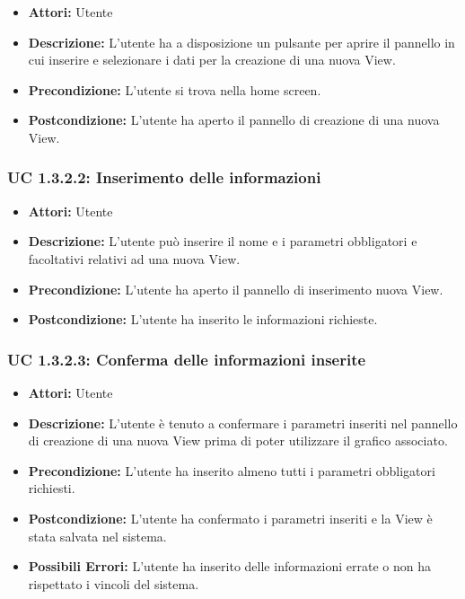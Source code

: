 \begin{itemize}
\item \textbf{Attori:} Utente
\item \textbf{Descrizione:} L'utente ha a disposizione un pulsante per aprire il pannello in cui inserire e selezionare i dati per la creazione di una nuova View.
\item \textbf{Precondizione:} L'utente si trova nella home screen.
\item \textbf{Postcondizione:} L'utente ha aperto il pannello di creazione di una nuova View.
\end{itemize}

\subsubsection{UC 1.3.2.2: Inserimento delle informazioni}

\begin{itemize}
\item \textbf{Attori:} Utente
\item \textbf{Descrizione:} L'utente può inserire il nome e i parametri obbligatori e facoltativi relativi ad una nuova View.
\item \textbf{Precondizione:} L'utente ha aperto il pannello di inserimento nuova View.
\item \textbf{Postcondizione:} L'utente ha inserito le informazioni richieste.
\end{itemize}

\subsubsection{UC 1.3.2.3: Conferma delle informazioni inserite}

\begin{itemize}
\item \textbf{Attori:} Utente
\item \textbf{Descrizione:} L'utente è tenuto a confermare i parametri inseriti nel pannello di creazione di una nuova View prima di poter utilizzare il grafico associato.
\item \textbf{Precondizione:} L'utente ha inserito almeno tutti i parametri obbligatori richiesti.
\item \textbf{Postcondizione:} L'utente ha confermato i parametri inseriti e la View è stata salvata nel sistema.
\item \textbf{Possibili Errori:} L'utente ha inserito delle informazioni errate o non ha rispettato i vincoli del sistema. 
\end{itemize}

